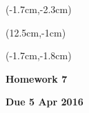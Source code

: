 \documentclass[12pt, oneside]{article}
\begin{document}


\begin{textblock*}{4cm}(-1.7cm,-2.3cm)
\end{textblock*}

\begin{textblock*}{8cm}(12.5cm,-1cm)
\end{textblock*}
\begin{textblock*}{13.5cm}(-1.7cm,-1.8cm)
\end{textblock*}

\vspace{1cm}

\begin{center}
\textbf{\Large Homework 7}

\textbf{Due 5 Apr 2016}
\end{center}
\end{document}
